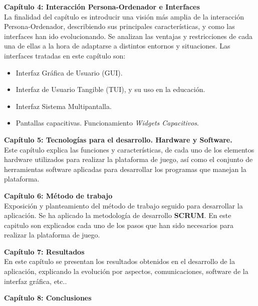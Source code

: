 \textbf{Capítulo 4: Interacción Persona-Ordenador e Interfaces}\\
La finalidad del capítulo es introducir una visión más amplia de la interacción Persona-Ordenador, describiendo sus principales características, y como las interfaces han ido evolucionando. Se analizan las ventajas y restricciones de cada una de ellas a la hora de adaptarse a distintos entornos y situaciones. Las interfaces tratadas en este capítulo son:
\begin{itemize}
\item Interfaz Gráfica de Usuario (GUI).
\item Interfaz de Usuario Tangible (TUI), y su uso en la educación.
\item Interfaz Sistema Multipantalla.
\item Pantallas capacitivas. Funcionamiento \emph{Widgets Capacitivos}.
\end{itemize}

\textbf{Capítulo 5: Tecnologías para el desarrollo. Hardware y Software.}\\
Este capítulo explica las funciones y características, de cada uno de los elementos hardware utilizados para realizar la plataforma de juego, así como el conjunto de herramientas software aplicadas para desarrollar los programas que manejan la plataforma.

\textbf{Capítulo 6: Método de trabajo}\\
Exposición y planteamiento del método de trabajo seguido para desarrollar la aplicación. Se ha aplicado la metodología de desarrollo \textbf{SCRUM}. En este capitulo son explicados cada uno de los pasos que han sido necesarios para realizar la plataforma de juego.


\textbf{Capítulo 7: Resultados}\\
En este capítulo se presentan los resultados obtenidos en el desarrollo de la aplicación, explicando la evolución por aspectos, comunicaciones, software de la interfaz gráfica, etc..

\textbf{Capítulo 8: Conclusiones}\\





